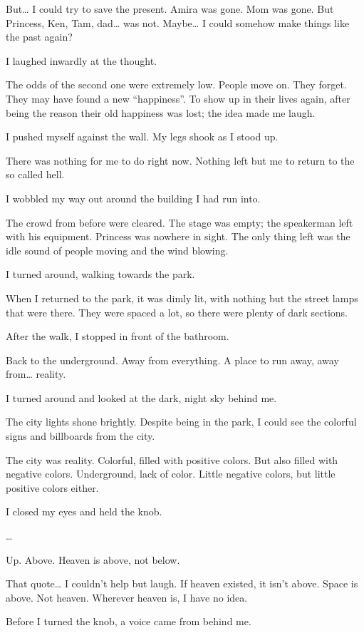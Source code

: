 But… I could try to save the present. Amira was gone. Mom was gone. But Princess, Ken, Tam, dad… was not. Maybe… I could somehow make things like the past again?

I laughed inwardly at the thought.

The odds of the second one were extremely low. People move on. They forget. They may have found a new “happiness”. To show up in their lives again, after being the reason their old happiness was lost; the idea made me laugh.

I pushed myself against the wall. My legs shook as I stood up.

There was nothing for me to do right now. Nothing left but me to return to the so called hell.

I wobbled my way out around the building I had run into.

The crowd from before were cleared. The stage was empty; the speakerman left with his equipment. Princess was nowhere in sight. The only thing left was the idle sound of people moving and the wind blowing. 

I turned around, walking towards the park. 

When I returned to the park, it was dimly lit, with nothing but the street lamps that were there. They were spaced a lot, so there were plenty of dark sections.

After the walk, I stopped in front of the bathroom. 

Back to the underground. Away from everything. A place to run away, away from… reality. 

I turned around and looked at the dark, night sky behind me.

The city lights shone brightly. Despite being in the park, I could see the colorful signs and billboards from the city. 

The city was reality. Colorful, filled with positive colors. But also filled with negative colors. Underground, lack of color. Little negative colors, but little positive colors either.

I closed my eyes and held the knob. 

…

Up. Above. Heaven is above, not below.

That quote… I couldn’t help but laugh. If heaven existed, it isn’t above. Space is above. Not heaven. Wherever heaven is, I have no idea.

Before I turned the knob, a voice came from behind me.

